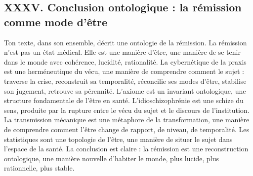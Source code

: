 \documentclass[12pt,a4paper]{article}
\begin{document}
\subsection*{XXXV. Conclusion ontologique : la rémission comme mode d’être}
Ton texte, dans son ensemble, décrit une ontologie de la rémission. La rémission n’est pas un état médical. Elle est une manière d’être, une manière de se tenir dans le monde avec cohérence, lucidité, rationalité.
La cybernétique de la praxis est une herméneutique du vécu, une manière de comprendre comment le sujet :
	traverse la crise,
	reconstruit sa temporalité,
	réconcilie ses modes d’être,
	stabilise son jugement,
	retrouve sa pérennité.
L’axiome est un invariant ontologique, une structure fondamentale de l’être en santé.
L’idioschizophrénie est une schize du sens, produite par la rupture entre le vécu du sujet et le discours de l’institution.
La transmission mécanique est une métaphore de la transformation, une manière de comprendre comment l’être change de rapport, de niveau, de temporalité.
Les statistiques sont une topologie de l’être, une manière de situer le sujet dans l’espace de la santé.
La conclusion est claire : la rémission est une reconstruction ontologique, une manière nouvelle d’habiter le monde, plus lucide, plus rationnelle, plus stable.
\end{document}
